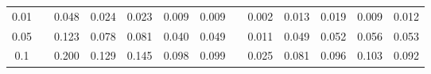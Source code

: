 % 
\begin{tabular}{ccccccccccccc}
  \hline
  \hline
0.01 &  & 0.048 & 0.024 & 0.023 & 0.009 & 0.009 &  & 0.002 & 0.013 & 0.019 & 0.009 & 0.012 \\ 
  0.05 &  & 0.123 & 0.078 & 0.081 & 0.040 & 0.049 &  & 0.011 & 0.049 & 0.052 & 0.056 & 0.053 \\ 
  0.1 &  & 0.200 & 0.129 & 0.145 & 0.098 & 0.099 &  & 0.025 & 0.081 & 0.096 & 0.103 & 0.092 \\ 
   \hline
\end{tabular}
